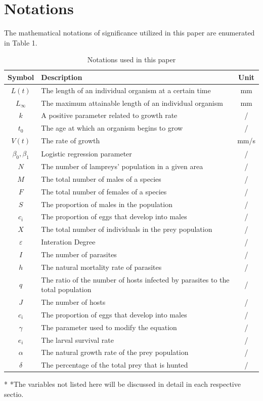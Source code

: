 \documentclass[12pt]{article}  %
\begin{document}
\section{Notations}
The mathematical notations of significance utilized in this paper are enumerated in Table 1.
\vspace{-0.4cm}
\begin{table}[htbp]
\begin{center}
\caption{Notations used in this paper}
\begin{tabular}{c l c}
\toprule[2pt]
\textbf{Symbol}
&\textbf{Description}
&\textbf{Unit }
\\
\midrule
$L(t)$& The length of an individual organism at a certain time& mm \\
$L_{\infty}$& The maximum attainable length of an individual organism& mm\\
$k$& A positive parameter related to growth rate&/\\
$t_{0}$& The age at which an organism begins to grow &/\\
$V(t)$ & The rate of growth &mm/s\\
\vspace{5pt}%
$\beta_{0},\beta_{1}$ & Logistic regression parameter&/\\
\vspace{3pt}
$N$ &The number of lampreys' population in a given area&/\\
$M$&The total number of males of a species&/\\
$F$&The total number of females of a species&/\\
$S$&The proportion of males in the population&/\\
$c_{i}$& The proportion of eggs that develop into males&/\\
$X$ & The total number of individuals in the prey population&/\\
$\varepsilon$& Interation Degree &/\\
$I$ & The number of parasites&/\\
$h$ & The natural mortality rate of parasites&/\\
$q$ & The ratio of the number of hosts infected by parasites to the total population&/\\
$J$ & The number of hosts&/\\
$c_{i}$ &  The proportion of eggs that develop into males&/\\
$\gamma$&  The parameter used to modify the equation&/\\ 
 $e_{i}$& The larval survival rate&/\\
 $\alpha$  & 	The natural growth rate of the prey population&/\\
 $\delta $& The percentage of the total prey that is hunted&/\\
\bottomrule[2pt]
\end{tabular}\label{tb:notation}
 \begin{tablenotes}
        \footnotesize
        \item[*] *The variables not listed here will be discussed in detail in each respective sectio. %
      \end{tablenotes}
\end{center}
\end{table}
\end{document}
